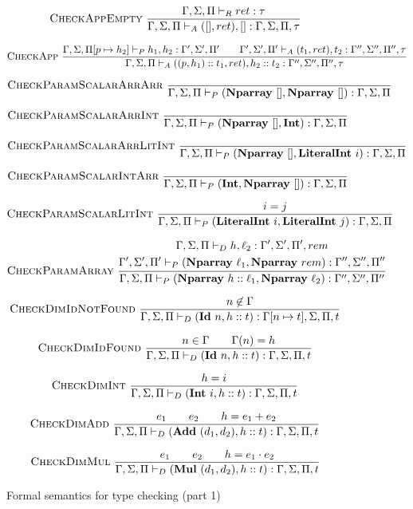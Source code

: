 \documentclass{article}
\begin{document}
\begin{figure}
    $$\textsc{CheckAppEmpty}~\frac{\Gamma, \Sigma, \Pi \vdash_R ret : \tau}{\Gamma, \Sigma, \Pi \vdash_A ([], ret), [] : \Gamma, \Sigma, \Pi, \tau}$$

    $$\textsc{CheckApp}~\frac{\Gamma, \Sigma, \Pi[p \mapsto h_2] \vdash_P h_1, h_2 : \Gamma', \Sigma', \Pi' \qquad \Gamma', \Sigma', \Pi' \vdash_A (t_1, ret), t_2 : \Gamma'', \Sigma'', \Pi'', \tau}{\Gamma, \Sigma, \Pi \vdash_A ((p, h_1) :: t_1, ret), h_2 :: t_2 : \Gamma'', \Sigma'', \Pi'', \tau}$$

    $$\textsc{CheckParamScalarArrArr}~\frac{}{\Gamma, \Sigma, \Pi \vdash_P (\textbf{Nparray}~[], \textbf{Nparray}~[]) : \Gamma, \Sigma, \Pi}$$

    $$\textsc{CheckParamScalarArrInt}~\frac{}{\Gamma, \Sigma, \Pi \vdash_P (\textbf{Nparray}~[], \textbf{Int}) : \Gamma, \Sigma, \Pi}$$

    $$\textsc{CheckParamScalarArrLitInt}~\frac{}{\Gamma, \Sigma, \Pi \vdash_P (\textbf{Nparray}~[], \textbf{LiteralInt}~i) : \Gamma, \Sigma, \Pi}$$

    $$\textsc{CheckParamScalarIntArr}~\frac{}{\Gamma, \Sigma, \Pi \vdash_P (\textbf{Int}, \textbf{Nparray}~[]) : \Gamma, \Sigma, \Pi}$$

    $$\textsc{CheckParamScalarLitInt}~\frac{i = j}{\Gamma, \Sigma, \Pi \vdash_P (\textbf{LiteralInt}~i, \textbf{LiteralInt}~j) : \Gamma, \Sigma, \Pi}$$

    $$\textsc{CheckParamArray}~\frac{\begin{gathered}\Gamma, \Sigma, \Pi \vdash_D h, \ell_2 : \Gamma', \Sigma', \Pi', rem \\ \Gamma', \Sigma', \Pi' \vdash_P (\textbf{Nparray}~\ell_1, \textbf{Nparray}~rem) : \Gamma'', \Sigma'', \Pi''\end{gathered}}{\Gamma, \Sigma, \Pi \vdash_P (\textbf{Nparray}~h :: \ell_1, \textbf{Nparray}~\ell_2) : \Gamma'', \Sigma'', \Pi''}$$

    $$\textsc{CheckDimIdNotFound}~\frac{n \not\in \Gamma}{\Gamma, \Sigma, \Pi \vdash_D (\textbf{Id}~n, h :: t) : \Gamma[n \mapsto t], \Sigma, \Pi, t}$$

    $$\textsc{CheckDimIdFound}~\frac{n \in \Gamma \qquad \Gamma(n) = h}{\Gamma, \Sigma, \Pi \vdash_D (\textbf{Id}~n, h :: t) : \Gamma, \Sigma, \Pi, t}$$

    $$\textsc{CheckDimInt}~\frac{h = i}{\Gamma, \Sigma, \Pi \vdash_D (\textbf{Int}~i, h :: t) : \Gamma, \Sigma, \Pi, t}$$

    $$\textsc{CheckDimAdd}~\frac{e_1 \qquad e_2 \qquad h = e_1 + e_2}{\Gamma, \Sigma, \Pi \vdash_D (\textbf{Add}~(d_1, d_2), h :: t) : \Gamma, \Sigma, \Pi, t}$$

    $$\textsc{CheckDimMul}~\frac{e_1 \qquad e_2 \qquad h = e_1 \cdot e_2}{\Gamma, \Sigma, \Pi \vdash_D (\textbf{Mul}~(d_1, d_2), h :: t) : \Gamma, \Sigma, \Pi, t}$$

    \caption{Formal semantics for type checking (part 1)}
    \label{semantics1}
\end{figure}
\end{document}
